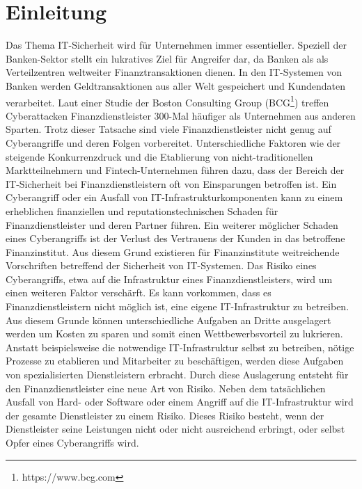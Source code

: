 \setlength{\parindent}{0em} 

\chapter{Einleitung}
\label{cha:einleitung}
Das Thema IT-Sicherheit wird für Unternehmen immer essentieller. Speziell der Banken-Sektor stellt ein lukratives Ziel für Angreifer dar, da Banken als als \glqq{}Verteilzentren\grqq{} weltweiter Finanztransaktionen dienen. In den IT-Systemen von Banken werden Geldtransaktionen aus aller Welt gespeichert und Kundendaten verarbeitet. 
Laut einer Studie der \glqq{}Boston Consulting Group\grqq{} (BCG\footnote{https://www.bcg.com}) treffen Cyberattacken Finanzdienstleister 300-Mal häufiger als Unternehmen aus anderen Sparten. Trotz dieser Tatsache sind viele Finanzdienstleister nicht genug auf Cyberangriffe und deren Folgen vorbereitet. 
Unterschiedliche Faktoren wie der steigende Konkurrenzdruck und die Etablierung von nicht-traditionellen Marktteilnehmern und Fintech-Unternehmen führen dazu, dass der Bereich der IT-Sicherheit bei Finanzdienstleistern oft von Einsparungen betroffen ist. \autocite{Zakrzewsk2019} 
\bigbreak
Ein Cyberangriff oder ein Ausfall von IT-Infrastrukturkomponenten kann zu einem erheblichen finanziellen und reputationstechnischen Schaden für Finanzdienstleister und deren Partner führen. Ein weiterer möglicher Schaden eines Cyberangriffs ist der Verlust des Vertrauens der Kunden in das betroffene Finanzinstitut. Aus diesem Grund existieren für Finanzinstitute weitreichende Vorschriften betreffend der Sicherheit von IT-Systemen. \cite{EY2021} 
\bigbreak
Das Risiko eines Cyberangriffs, etwa auf die Infrastruktur eines Finanzdienstleisters, wird um einen weiteren Faktor verschärft. Es kann vorkommen, dass es Finanzdienstleistern nicht möglich ist, eine eigene IT-Infrastruktur zu betreiben. Aus diesem Grunde können unterschiedliche Aufgaben an Dritte ausgelagert werden um Kosten zu sparen und somit einen Wettbewerbsvorteil zu lukrieren. Anstatt beispielsweise die notwendige IT-Infrastruktur selbst zu betreiben, nötige Prozesse zu etablieren und Mitarbeiter zu beschäftigen, werden diese Aufgaben von spezialisierten Dienstleistern erbracht. Durch diese Auslagerung entsteht für den Finanzdienstleister eine neue Art von Risiko. Neben dem tatsächlichen Ausfall von Hard- oder Software oder einem Angriff auf die IT-Infrastruktur wird der gesamte Dienstleister zu einem Risiko. Dieses Risiko besteht, wenn der Dienstleister seine Leistungen nicht oder nicht ausreichend erbringt, oder selbst Opfer eines Cyberangriffs wird. \autocite{Presse2019} 
